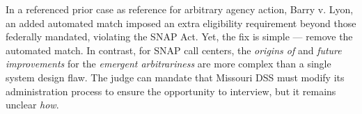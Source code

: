 \documentclass[manuscript,screen,authorversion]{acmart}
\begin{document}
In a referenced prior case as reference for arbitrary agency action, Barry v. Lyon, an added automated match imposed an extra eligibility requirement beyond those federally mandated, violating the SNAP Act. Yet, the fix is simple --- remove the automated match. In contrast, for SNAP call centers, the \textit{origins of} and \textit{future improvements} for the \textit{emergent arbitrariness} are more complex than a single system design flaw. The judge can mandate that Missouri DSS must modify its administration process to ensure the opportunity to interview, but it remains unclear \textit{how}.

\end{document}
